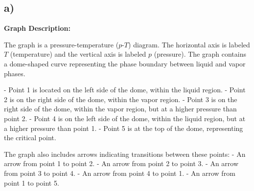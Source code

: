 

\subsection*{a)}

\begin{center}
\textbf{Graph Description:}
\end{center}

The graph is a pressure-temperature ($p$-$T$) diagram. The horizontal axis is labeled $T$ (temperature) and the vertical axis is labeled $p$ (pressure). The graph contains a dome-shaped curve representing the phase boundary between liquid and vapor phases. 

- Point 1 is located on the left side of the dome, within the liquid region.
- Point 2 is on the right side of the dome, within the vapor region.
- Point 3 is on the right side of the dome, within the vapor region, but at a higher pressure than point 2.
- Point 4 is on the left side of the dome, within the liquid region, but at a higher pressure than point 1.
- Point 5 is at the top of the dome, representing the critical point.

The graph also includes arrows indicating transitions between these points:
- An arrow from point 1 to point 2.
- An arrow from point 2 to point 3.
- An arrow from point 3 to point 4.
- An arrow from point 4 to point 1.
- An arrow from point 1 to point 5.